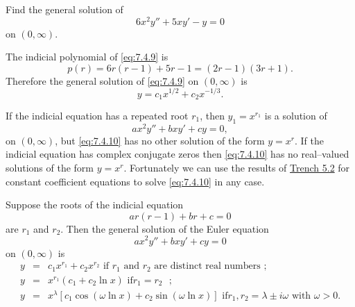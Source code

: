 \documentclass{ximera}
\begin{document}
\begin{example}\label{example:7.4.5}
  Find the general solution of
\begin{equation} \label{eq:7.4.9}
6x^2y''+5xy'-y=0
\end{equation}
on  $(0,\infty)$.
\begin{explanation}
The indicial polynomial of \eqref{eq:7.4.9} is
$$
p(r)=6r(r-1)+5r-1=(2r-1)(3r+1).
$$
Therefore the general solution of \eqref{eq:7.4.9} on
$(0,\infty)$ is
$$
y=c_1x^{1/2}+c_2x^{-1/3}.
$$
\end{explanation}
\end{example}



If the indicial equation  has a repeated root $r_1$, then
$y_1=x^{r_1}$ is a solution of
\begin{equation} \label{eq:7.4.10}
ax^2y''+bxy'+cy=0,
\end{equation}
on $(0,\infty)$, but \eqref{eq:7.4.10} has no other solution of the form
$y=x^r$. If the indicial equation has complex conjugate zeros then
\eqref{eq:7.4.10} has no real--valued solutions of the form $y=x^r$.
Fortunately we can use the results of 
\href{https://ximera.osu.edu/ode/main/constantCoefficientHomogeneousEquations/constantCoefficientHomogeneousEquations}{Trench 5.2} 
for constant coefficient equations to solve \eqref{eq:7.4.10} in any case.

\begin{theorem}\label{thmtype:7.4.3}
Suppose the roots of the indicial equation
\begin{equation}
\label{eq:7.4.11} ar(r-1)+br+c=0
\end{equation}
are $r_1$ and $r_2$. Then the general solution of the Euler equation
\begin{equation} \label{eq:7.4.12}
ax^2y''+bxy'+cy=0
\end{equation}
 on  $(0,\infty)$ is
\begin{eqnarray*}
y&=&c_1x^{r_1}+c_2x^{r_2}\mbox{ if $r_1$ and $r_2$ are distinct
real numbers  };
\\ y&=&x^{r_1}(c_1+c_2\ln x)\mbox{ if
$r_1=r_2$  };
\\ y&=&x^{\lambda}\left[c_1\cos\left(\omega\ln x\right)+
c_2\sin\left(\omega\ln x \right)\right]\mbox{ if
$r_1,r_2=\lambda\pm i\omega$ with $\omega>0$}.
\end{eqnarray*}
\end{theorem}
\end{document}
